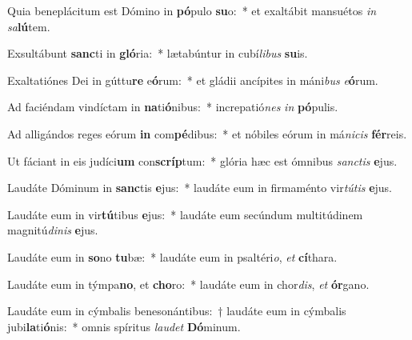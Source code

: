 \item Quia beneplácitum est Dómino in \textbf{pó}pulo \textbf{su}o:~* et exaltábit mansuétos \textit{in} \textit{sa}\textbf{lú}tem.
\item Exsultábunt \textbf{sanc}ti in \textbf{gló}ria:~* lætabúntur in cubí\textit{li}\textit{bus} \textbf{su}is.
\item Exaltatiónes Dei in gúttu\textbf{re} e\textbf{ó}rum:~* et gládii ancípites in máni\textit{bus} \textit{e}\textbf{ó}rum.
\item Ad faciéndam vindíctam in \textbf{na}ti\textbf{ó}nibus:~* increpatió\textit{nes} \textit{in} \textbf{pó}pulis.
\item Ad alligándos reges eórum \textbf{in} com\textbf{pé}dibus:~* et nóbiles eórum in má\textit{ni}\textit{cis} \textbf{fér}reis.
\item Ut fáciant in eis judíci\textbf{um} con\textbf{scríp}tum:~* glória hæc est ómnibus \textit{sanc}\textit{tis} \textbf{e}jus.
\item Laudáte Dóminum in \textbf{sanc}tis \textbf{e}jus:~* laudáte eum in firmaménto vir\textit{tú}\textit{tis} \textbf{e}jus.
\item Laudáte eum in vir\textbf{tú}tibus \textbf{e}jus:~* laudáte eum secúndum multitúdinem magnitú\textit{di}\textit{nis} \textbf{e}jus.
\item Laudáte eum in \textbf{so}no \textbf{tu}bæ:~* laudáte eum in psaltéri\textit{o}, \textit{et} \textbf{cí}thara.
\item Laudáte eum in týmpa\textbf{no}, et \textbf{cho}ro:~* laudáte eum in chor\textit{dis}, \textit{et} \textbf{ór}gano.
\item Laudáte eum in cýmbalis benesonántibus:~† laudáte eum in cýmbalis jubi\textbf{la}ti\textbf{ó}nis:~* omnis spíritus \textit{lau}\textit{det} \textbf{Dó}minum.
